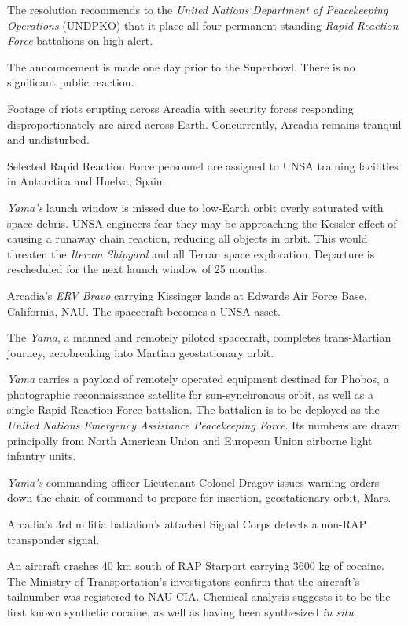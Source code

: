 The resolution recommends to the {\it United Nations Department of Peacekeeping Operations} (UNDPKO) that it place all four permanent standing {\it Rapid Reaction Force} battalions on high alert.

The announcement is made one day prior to the Superbowl. There is no significant public reaction.
\StopTimelineDate

Footage of riots erupting across Arcadia with security forces responding disproportionately are aired across Earth. Concurrently, Arcadia remains tranquil and undisturbed.
\StopTimelineDate

Selected Rapid Reaction Force personnel are assigned to UNSA training facilities in Antarctica and Huelva, Spain.
\StopTimelineDate

{\it Yama's} launch window is missed due to low-Earth orbit overly saturated with space debris. UNSA engineers fear they may be approaching the Kessler effect of causing a runaway chain reaction, reducing all objects in orbit. This would threaten the {\it Iterum Shipyard} and all Terran space exploration. Departure is rescheduled for the next launch window of 25 months.
\StopTimelineDate

Arcadia's {\it ERV Bravo} carrying Kissinger lands at Edwards Air Force Base, California, NAU. The spacecraft becomes a UNSA asset.
\StopTimelineDate

The {\it Yama}, a manned and remotely piloted spacecraft, completes trans-Martian journey, aerobreaking into Martian geostationary orbit. 

{\it Yama} carries a payload of remotely operated equipment destined for Phobos, a photographic reconnaissance satellite for sun-synchronous orbit, as well as a single Rapid Reaction Force battalion. The battalion is to be deployed as the {\it United Nations Emergency Assistance Peacekeeping Force}. Its numbers are drawn principally from North American Union and European Union airborne light infantry units.
\StopTimelineDate

{\it Yama's} commanding officer Lieutenant Colonel Dragov issues warning orders down the chain of command to prepare for insertion, geostationary orbit, Mars.
\StopTimelineDate

Arcadia's 3rd militia battalion's attached Signal Corps detects a non-RAP transponder signal.
\StopTimelineDate

An aircraft crashes 40 km south of RAP Starport carrying 3600 kg of cocaine. The Ministry of Transportation's investigators confirm that the aircraft's tailnumber was registered to NAU CIA. Chemical analysis suggests it to be the first known synthetic cocaine, as well as having been synthesized {\it in situ}.
\StopTimelineDate

\stoplines

\StopChapter

